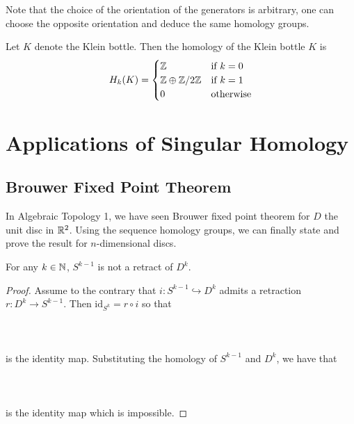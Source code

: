 \documentclass[a4paper]{article}
\begin{document}
Note that the choice of the orientation of the generators is arbitrary, one can choose the opposite orientation and deduce the same homology groups. 

\begin{thm}{}{} Let $K$ denote the Klein bottle. Then the homology of the Klein bottle $K$ is $$H_k(K)=\begin{cases}
\mathbb{Z} & \text{if } k=0\\
\mathbb{Z}\oplus\mathbb{Z}/2\mathbb{Z} & \text{if } k=1\\
0 & \text{otherwise}
\end{cases}$$
\end{thm}

\pagebreak
\section{Applications of Singular Homology}
\subsection{Brouwer Fixed Point Theorem}
In Algebraic Topology 1, we have seen Brouwer fixed point theorem for $D$ the unit disc in $\mathbb{R}^2$. Using the sequence homology groups, we can finally state and prove the result for $n$-dimensional discs. 

\begin{crl}{}{} For any $k\in\mathbb{N}$, $S^{k-1}$ is not a retract of $D^k$. \tcbline
\begin{proof}
Assume to the contrary that $i:S^{k-1}\hookrightarrow D^k$ admits a retraction $r:D^k\to S^{k-1}$. Then $\text{id}_{S^k}=r\circ i$ so that \\~\\
\\~\\
is the identity map. Substituting the homology of $S^{k-1}$ and $D^k$, we have that \\~\\
\\~\\
is the identity map which is impossible. 
\end{proof}
\end{crl}
\end{document}

